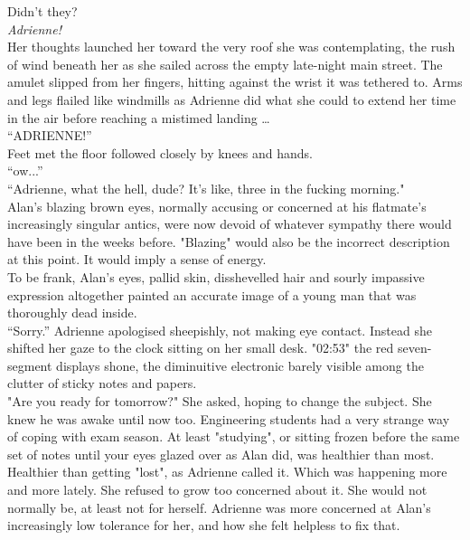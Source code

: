 Didn't they?\\

\textit{Adrienne!}\\

Her thoughts launched her toward the very roof she was contemplating, the rush of wind beneath her as she sailed across the empty late-night main street.
The amulet slipped from her fingers, hitting against the wrist it was tethered to.
Arms and legs flailed like windmills as Adrienne did what she could to extend her time in the air before reaching a mistimed landing \dots\\

``ADRIENNE!''\\

Feet met the floor followed closely by knees and hands.\\

``ow...''\\

``Adrienne, what the hell, dude? It's like, three in the fucking morning."\\

Alan's blazing brown eyes, normally accusing or concerned at his flatmate's increasingly singular antics, were now devoid of whatever sympathy there would have been in the weeks before.
"Blazing" would also be the incorrect description at this point.
It would imply a sense of energy.\\ 

To be frank, Alan's eyes, pallid skin, disshevelled hair and sourly impassive expression altogether painted an accurate image of a young man that was thoroughly dead inside.\\

``Sorry.'' Adrienne apologised sheepishly, not making eye contact. 
Instead she shifted her gaze to the clock sitting on her small desk.
"02:53" the red seven-segment displays shone, the diminuitive electronic barely visible among the clutter of sticky notes and papers.\\

"Are you ready for tomorrow?" She asked, hoping to change the subject. She knew he was awake until now too. 
Engineering students had a very strange way of coping with exam season. 
At least "studying", or sitting frozen before the same set of notes until your eyes glazed over as Alan did, was healthier than most.\\

Healthier than getting "lost", as Adrienne called it. 
Which was happening more and more lately.
She refused to grow too concerned about it.
She would not normally be, at least not for herself.
Adrienne was more concerned at Alan's increasingly low tolerance for her, and how she felt helpless to fix that.\\

